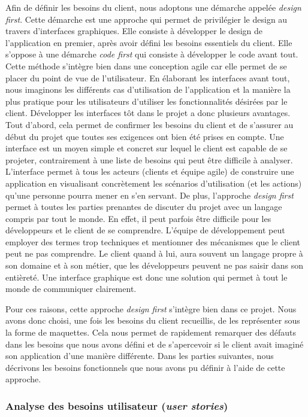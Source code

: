 \documentclass{article}
\begin{document}
Afin de définir les besoins du client, nous adoptons une démarche appelée \textit{design first}. Cette démarche est une approche qui permet de privilégier
le design au travers d'interfaces graphiques. Elle consiste à développer le design de l'application en premier, après avoir 
défini les besoins essentiels du client.
Elle s'oppose à une démarche \textit{code first} qui consiste à développer le code avant tout.
Cette méthode s'intègre bien dans une conception agile car elle permet de se placer du point de vue de l'utilisateur. En élaborant les interfaces avant tout,
nous imaginons les différents cas d'utilisation de l'application et la manière la plus pratique pour les utilisateurs d'utiliser les fonctionnalités désirées par le client.
Développer les interfaces tôt dans le projet a donc plusieurs avantages. Tout d'abord, cela permet de confirmer les besoins du client et de s'assurer au début du projet que 
toutes ses exigences ont bien été prises en compte. Une interface est un moyen simple et concret sur lequel le client est capable de se projeter, contrairement à 
une liste de besoins qui peut être difficile à analyser. L'interface permet à tous les acteurs (clients et équipe agile) de construire une application
en visualisant concrètement les scénarios d'utilisation (et les actions) qu'une personne pourra mener en s'en servant.
De plus, l'approche \textit{design first} permet à toutes les parties prenantes de discuter du projet avec un langage compris par tout le monde.
En effet, il peut parfois être difficile pour les développeurs et le client de se comprendre. L'équipe de développement peut employer des termes trop techniques et 
mentionner des mécanismes que le client peut ne pas comprendre. Le client quand à lui, aura souvent un langage propre à son domaine et à son métier, que les développeurs peuvent ne pas 
saisir dans son entièreté. Une interface graphique est donc une solution qui permet à tout le monde de communiquer clairement.

Pour ces raisons, cette approche \textit{design first} s'intègre bien dans ce projet. Nous avons donc choisi, une fois les besoins du client recueillis, de les représenter sous la forme 
de maquettes. Cela nous permet de rapidement remarquer des défauts dans les besoins que nous avons défini et de s'apercevoir si le client avait imaginé son application d'une manière différente.  
Dans les parties suivantes, nous décrivons les besoins fonctionnels que nous avons pu définir à l'aide de cette approche.

\subsubsection{Analyse des besoins utilisateur (\textit{user stories})} \label{sec:userstories}
\end{document}
